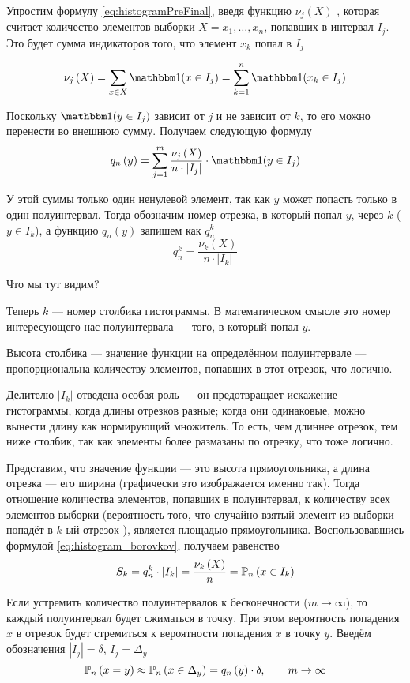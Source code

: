 Упростим формулу \eqref{eq:histogramPreFinal}, введя функцию
$\nu_j\left(X\right)$ \cite[стр.~68]{BorovkovMS},
которая считает количество элементов выборки $X=x_1, \dots, x_n$,
попавших в интервал $I_j$.
Это будет сумма индикаторов того, что элемент $x_k$ попал в $I_j$

$$\nu_j\left(X\right)
=\sum_{x\in X} \indicator{x\in I_j}
=\sum_{k=1}^n \indicator{x_k\in I_j}$$

Поскольку $\indicator{y\in I_j}$ зависит от $j$ и не зависит от $k$,
то его можно перенести во внешнюю сумму. Получаем следующую формулу
$$q_n\left(y\right)
=\sum_{j=1}^m \frac{\nu_j\left(X\right)}{n\cdot\left|I_j\right|}
    \cdot \indicator{y\in I_j}$$

У этой суммы только один ненулевой элемент,
так как $y$ может попасть только в один полуинтервал.
Тогда обозначим номер отрезка, в который попал $y$, через $k$ ($y\in I_k$),
а функцию $q_n\left(y\right)$ запишем как $q_n^k$
\begin{equation}\label{eq:histogram_borovkov}
    q_n^k = \frac{\nu_k\left(X\right)}{n\cdot\left|I_k\right|}
\end{equation}


Что мы тут видим?

Теперь $k$ --- номер столбика гистограммы. В математическом смысле это
номер интересующего нас полуинтервала --- того, в который попал $y$.

Высота столбика --- значение функции на определённом полуинтервале ---
пропорциональна количеству элементов, попавших в этот отрезок, что логично.

Делителю $\left|I_k\right|$ отведена особая роль --- он предотвращает
искажение гистограммы, когда длины отрезков разные; когда они одинаковые,
можно вынести длину как нормирующий множитель. То есть, чем длиннее отрезок,
тем ниже столбик, так как элементы более размазаны по отрезку, что тоже логично.

Представим, что значение функции --- это высота прямоугольника,
а длина отрезка --- его ширина (графически это изображается именно так).
Тогда отношение количества элементов, попавших в полуинтервал,
к количеству всех элементов выборки (вероятность того, что случайно взятый
элемент из выборки попадёт в $k$-ый отрезок \cite[стр.~24]{BorovkovMS}),
является площадью прямоугольника. Воспользовавшись формулой
\eqref{eq:histogram_borovkov}, получаем равенство
$$S_k
    = q_n^k \cdot \left| I_k \right|
    = \frac{\nu_k\left(X\right)}{n}=\mathbb{P}_n\left( x\in I_k \right)$$

Если устремить количество полуинтервалов к бесконечности ($m\to\infty$),
то каждый полуинтервал будет сжиматься в точку.
При этом вероятность попадения $x$ в отрезок будет стремиться
к вероятности попадения $x$ в точку $y$.
Введём обозначения $|I_j|=\delta$, $I_j=\Delta_y$
$$\mathbb{P}_n\left( x=y \right)
\approx\mathbb{P}_n\left( x\in\Delta_y \right)=q_n\left(y\right)\cdot\delta,
\qquad m\to\infty$$


